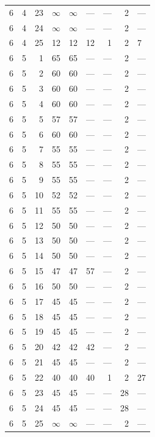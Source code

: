 \begin{longtable}{rrrrrrrrl}
6 & 4 & 23 & $\infty$ & $\infty$ & --- & --- & 2 & --- \\
6 & 4 & 24 & $\infty$ & $\infty$ & --- & --- & 2 & --- \\
6 & 4 & 25 & 12 & 12 & 12 & 1 & 2 & 7 \\
6 & 5 & 1 & 65 & 65 & --- & --- & 2 & --- \\
6 & 5 & 2 & 60 & 60 & --- & --- & 2 & --- \\
6 & 5 & 3 & 60 & 60 & --- & --- & 2 & --- \\
6 & 5 & 4 & 60 & 60 & --- & --- & 2 & --- \\
6 & 5 & 5 & 57 & 57 & --- & --- & 2 & --- \\
6 & 5 & 6 & 60 & 60 & --- & --- & 2 & --- \\
6 & 5 & 7 & 55 & 55 & --- & --- & 2 & --- \\
6 & 5 & 8 & 55 & 55 & --- & --- & 2 & --- \\
6 & 5 & 9 & 55 & 55 & --- & --- & 2 & --- \\
6 & 5 & 10 & 52 & 52 & --- & --- & 2 & --- \\
6 & 5 & 11 & 55 & 55 & --- & --- & 2 & --- \\
6 & 5 & 12 & 50 & 50 & --- & --- & 2 & --- \\
6 & 5 & 13 & 50 & 50 & --- & --- & 2 & --- \\
6 & 5 & 14 & 50 & 50 & --- & --- & 2 & --- \\
6 & 5 & 15 & 47 & 47 & 57 & --- & 2 & --- \\
6 & 5 & 16 & 50 & 50 & --- & --- & 2 & --- \\
6 & 5 & 17 & 45 & 45 & --- & --- & 2 & --- \\
6 & 5 & 18 & 45 & 45 & --- & --- & 2 & --- \\
6 & 5 & 19 & 45 & 45 & --- & --- & 2 & --- \\
6 & 5 & 20 & 42 & 42 & 42 & --- & 2 & --- \\
6 & 5 & 21 & 45 & 45 & --- & --- & 2 & --- \\
6 & 5 & 22 & 40 & 40 & 40 & 1 & 2 & 27 \\
6 & 5 & 23 & 45 & 45 & --- & --- & 28 & --- \\
6 & 5 & 24 & 45 & 45 & --- & --- & 28 & --- \\
6 & 5 & 25 & $\infty$ & $\infty$ & --- & --- & 2 & --- \\
\bottomrule\end{longtable}
